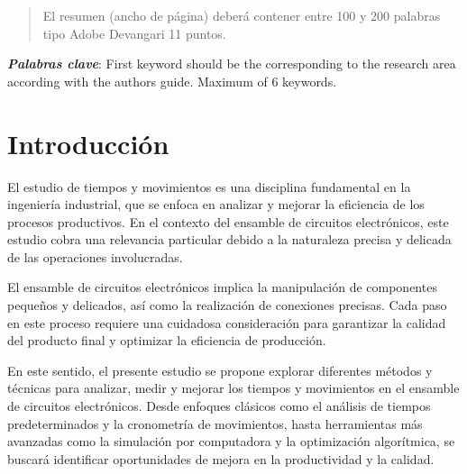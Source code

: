     
    
    \begin{abstract}
    \noindent 
    El resumen (ancho de página) deberá contener entre 100 y 200 palabras tipo Adobe Devangari 11 puntos.
    
    \end{abstract}
    \textbf{\textit{Palabras clave}}: {First keyword should be the corresponding to the research area according with the authors guide. Maximum of 6 keywords.}
    
    \section{Introducción}
    
        El estudio de tiempos y movimientos es una disciplina fundamental en la ingeniería industrial, que se enfoca en analizar y mejorar la eficiencia de los procesos productivos. En el contexto del ensamble de circuitos electrónicos, este estudio cobra una relevancia particular debido a la naturaleza precisa y delicada de las operaciones involucradas.
    
        El ensamble de circuitos electrónicos implica la manipulación de componentes pequeños y delicados, así como la realización de conexiones precisas. Cada paso en este proceso requiere una cuidadosa consideración para garantizar la calidad del producto final y optimizar la eficiencia de producción.
    
        En este sentido, el presente estudio se propone explorar diferentes métodos y técnicas para analizar, medir y mejorar los tiempos y movimientos en el ensamble de circuitos electrónicos. Desde enfoques clásicos como el análisis de tiempos predeterminados y la cronometría de movimientos, hasta herramientas más avanzadas como la simulación por computadora y la optimización algorítmica, se buscará identificar oportunidades de mejora en la productividad y la calidad.
        
